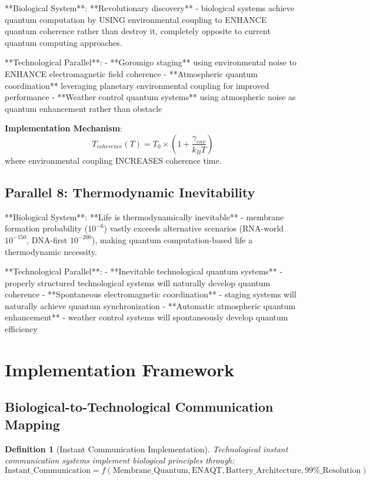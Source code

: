 \documentclass[12pt,a4paper]{article}
\newtheorem{definition}[theorem]{Definition}
\begin{document}
**Biological System**: **Revolutionary discovery** - biological systems achieve quantum computation by USING environmental coupling to ENHANCE quantum coherence rather than destroy it, completely opposite to current quantum computing approaches.

**Technological Parallel**:
- **Goromigo staging** using environmental noise to ENHANCE electromagnetic field coherence
- **Atmospheric quantum coordination** leveraging planetary environmental coupling for improved performance
- **Weather control quantum systems** using atmospheric noise as quantum enhancement rather than obstacle

\textbf{Implementation Mechanism}:
$$T_{coherence}(T) = T_0 \times \left(1 + \frac{\gamma_{env}}{k_B T}\right)$$
where environmental coupling INCREASES coherence time.

\subsection{Parallel 8: Thermodynamic Inevitability}

**Biological System**: **Life is thermodynamically inevitable** - membrane formation probability ($10^{-6}$) vastly exceeds alternative scenarios (RNA-world $10^{-150}$, DNA-first $10^{-200}$), making quantum computation-based life a thermodynamic necessity.

**Technological Parallel**:
- **Inevitable technological quantum systems** - properly structured technological systems will naturally develop quantum coherence
- **Spontaneous electromagnetic coordination** - staging systems will naturally achieve quantum synchronization
- **Automatic atmospheric quantum enhancement** - weather control systems will spontaneously develop quantum efficiency

\section{Implementation Framework}

\subsection{Biological-to-Technological Communication Mapping}

\begin{definition}[Instant Communication Implementation]
Technological instant communication systems implement biological principles through:
\begin{equation}
\text{Instant\_Communication} = f(\text{Membrane\_Quantum}, \text{ENAQT}, \text{Battery\_Architecture}, \text{99\%\_Resolution})
\end{equation}
\end{definition}
\end{document}
